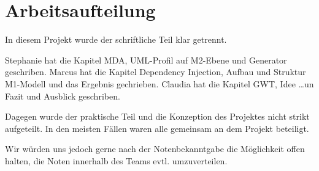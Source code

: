 \chapter{Arbeitsaufteilung}
\label{Arbeitsaufteilung}
In diesem Projekt wurde der schriftliche Teil klar getrennt.

Stephanie hat die Kapitel MDA, UML-Profil auf M2-Ebene und Generator geschriben.
Marcus hat die Kapitel Dependency Injection, Aufbau und Struktur M1-Modell und
das Ergebnis gechrieben.
Claudia hat die Kapitel GWT, Idee \ldots un Fazit und Ausblick geschriben.

Dagegen wurde der praktische Teil und die Konzeption des Projektes nicht
strikt aufgeteilt. In den meisten Fällen waren alle gemeinsam an dem Projekt
beteiligt.

Wir würden uns jedoch gerne nach der Notenbekanntgabe die Möglichkeit offen
halten, die Noten innerhalb des Teams evtl. umzuverteilen.

